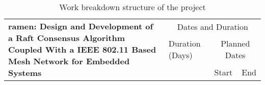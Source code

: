 \begin{table}[H]
    \scriptsize
    
    \renewcommand{\arraystretch}{1.125}
    
    
    \newcommand{\setCurrDate}[3]{\setdatenumber{#1}{#2}{#3}}
    
    \def\datedate{\thedatemonth/\thedateday/\thedateyear}
    
    \newcommand{\TEdate}[1]{
        \setdatebynumber{\thedatenumber}
        \multicolumn{1}{c}{#1} & 
        \datedate & 
        \addtocounter{datenumber}{#1} \setdatebynumber{\thedatenumber}
        \datedate
    }
    
    \setcounter{SubTableEntryID}{0}
    \setcounter{TableEntryID}{0}
    \newcommand\showTE{\setcounter{SubTableEntryID}{0}\stepcounter{TableEntryID}\theTableEntryID.\theSubTableEntryID \ }
    \newcommand\showSubTE{\stepcounter{SubTableEntryID}\theTableEntryID.\theSubTableEntryID \ }
    
    \newcommand{\tableEntry}[1]{\hline \multirow{2}{*}{\showTE #1}}
    \newcommand{\subTableEntry}[2]{& \showSubTE #1 & \TEdate{#2} \\ \cline{2-5}}
    \newcommand{\initialTableEntry}[2]{&0.1 #1 & \TEdate{#2} \\ \cline{2-5}}
    \newcommand{\finalTableEntry}[2]{\hline &\showTE #1 & \TEdate{#2} \\ \hline}
    
    \vspace{10pt}
    \caption{Work breakdown structure of the project}
    \label{tab:work_breakdown_structure}
    
    \begin{center}
        \begin{tabular}{|l|p{30em}|p{3.5em}|r|r|}
            \hline
            \multicolumn{2}{|l|}{\multirow{3}{9cm}{\textbf{ramen: Design and Development of a Raft Consensus Algorithm Coupled With a IEEE 802.11 Based Mesh Network for Embedded Systems}}} & \multicolumn{3}{c|}{Dates and Duration} \\ \cline{3-5}
            \multicolumn{2}{|l|}{ } & Duration (Days) & \multicolumn{2}{c|}{Planned Dates} \\ \cline{3-5}
            \multicolumn{2}{|l|}{ } & & \multicolumn{1}{c}{Start} & \multicolumn{1}{|c|}{End} \\ \hline
            

\end{tabular}
\end{center}
\end{table}
